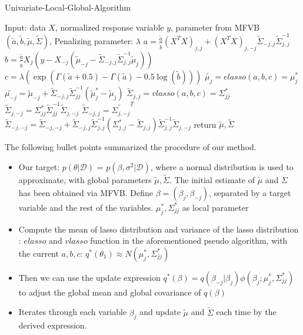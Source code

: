 \newpage
\begin{algorithm}
	\caption{Univariate-Local-Global-Algorithm}
	\begin{algorithmic}[1]
		
    \State Input: data $X$, normalized response variable $y$, parameter from MFVB $(\tilde{a},\tilde{b},\tilde{\mu},\tilde{\Sigma})$, Penalizing parameter: $\lambda$
	\State $a = \frac{\tilde{a}}{\tilde{b}}(X^TX)_{j,j} + (X^TX)_{j,-j}\tilde{\Sigma}_{-j,j}\tilde{\Sigma}_{j,j}^{-1}$ 
	\State $b = \frac{\tilde{a}}{\tilde{b}}  X_{j}(y-X_{-j}(\tilde{\mu}_{-j} - \tilde{\Sigma}_{-j,j}\tilde{\Sigma}_{j,j}^{-1}\tilde{\mu}_j))       $ 
	\State $c = \lambda (\exp(\Gamma(\tilde{a}+0.5) - \Gamma(\tilde{a}) - 0.5\log(\tilde{b})))  $ 
	\State $\tilde{\mu_{j}} =  elasso(a,b,c) = \mu_j ^*$ 
	\State $\tilde{\mu_{-j}} = \tilde{\mu}_{-j} +  \tilde{\Sigma}_{-j,j}\tilde{\Sigma}^{-1}_{jj}(\tilde{\mu}_j^*-\tilde{\mu}_j)$ 
	\State $\tilde{\Sigma}_{j,j} = vlasso(a,b,c) = \Sigma_{jj}^*$ 
	\State $\tilde{\Sigma}_{j,-j} = \Sigma_{jj}^*  \tilde{\Sigma}_{jj}^{-1}\tilde{\Sigma}_{j,-j} $ 
	\State $\tilde{\Sigma}_{-j,j} = \tilde{\Sigma_{j,-j}}^T$ 
	\State $\tilde{\Sigma}_{-j,-j} = \tilde{\Sigma}_{-j,-j} + \tilde{\Sigma}_{-j,j}\tilde{\Sigma}_{j,j}^{-1}(\Sigma_{j,j}^{*} - \tilde{\Sigma}_{j,j})\tilde{\Sigma}_{j,j}^{-1}\tilde{\Sigma}_{j,-j}$ 		
	\EndFor
	\EndWhile
	\State return $\tilde{\mu},\tilde{\Sigma}$
	\end{algorithmic}
\end{algorithm}


The following bullet points summarized the procedure of our method.
\begin{itemize}
	\item Our target: $p(\theta|\mathcal{D})$ = $p(\beta, \sigma^2|\mathcal{D})$, where a normal distribution is used to approximate, with global parameters $\tilde{\mu},\tilde{\Sigma}$. The initial estimate of $\tilde{\mu}$ and $\Sigma$ has been obtained via MFVB. Define $\beta = (\beta_j,\beta_{-j})$, separated by a target variable and the rest of the variables. $\mu_{j}^*, \Sigma_{jj}^*$ as local parameter
	
	
	\item Compute the mean of lasso distribution and variance of the lasso distribution : $elasso$ and $vlasso$ function in the aforementioned pseudo algorithm, with the current $a,b,c$: $q^*(\theta_1) \approx N(\mu_j^*,\Sigma_{jj}^*)$
	\item Then we can use the update expression $q^*(\beta) = q(\beta_{-j}|\beta_j)\phi(\beta_j;\mu_j^*,\Sigma_{jj}^*)$ to adjust the global mean and global covariance of $q(\beta)$
	\item Iterates through each variable $\beta_j$ and update $\tilde{\mu}$ and $\tilde{\Sigma}$ each time by the derived expression.
\end{itemize}

